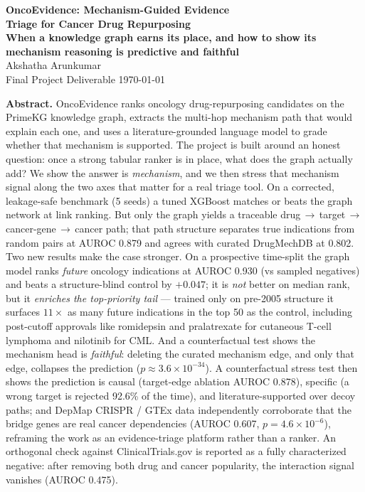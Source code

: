 \documentclass[11pt]{article}
\begin{document}
\begin{center}
  {\LARGE\bfseries\color{sriblue} OncoEvidence: Mechanism-Guided Evidence\\ Triage for Cancer Drug Repurposing}\\[4pt]
  {\large\bfseries\color{sriblue!80!black} When a knowledge graph earns its place, and how to show its\\ mechanism reasoning is predictive and faithful}\\[10pt]
  {\large Akshatha Arunkumar}\\[2pt]
  {\small Final Project Deliverable \quad\textbar\quad \today}
\end{center}

\vspace{2pt}
\begin{problembox}
\textbf{Abstract.} OncoEvidence ranks oncology drug-repurposing candidates on the
PrimeKG knowledge graph, extracts the multi-hop mechanism path that would explain each
one, and uses a literature-grounded language model to grade whether that mechanism is
supported. The project is built around an honest question: once a strong tabular ranker
is in place, what does the graph actually add? We show the answer is \emph{mechanism},
and we then stress that mechanism signal along the two axes that matter for a real
triage tool. On a corrected, leakage-safe benchmark (5 seeds) a tuned XGBoost matches or
beats the graph network at link ranking. But only the graph yields a traceable
drug\,$\to$\,target\,$\to$\,cancer-gene\,$\to$\,cancer path; that path structure
separates true indications from random pairs at AUROC 0.879 and agrees with curated
DrugMechDB at 0.802. Two new results make the case stronger. On a prospective time-split
the graph model ranks \emph{future} oncology indications at AUROC 0.930 (vs sampled
negatives) and beats a structure-blind control by $+0.047$; it is \emph{not} better on
median rank, but it \emph{enriches the top-priority tail} --- trained only on pre-2005
structure it surfaces $11\times$ as many future indications in the top 50 as the control,
including post-cutoff approvals like romidepsin and pralatrexate for cutaneous T-cell
lymphoma and nilotinib for CML. And a counterfactual test shows the mechanism head is \emph{faithful}:
deleting the curated mechanism edge, and only that edge, collapses the prediction
($p\approx3.6\times10^{-34}$). A counterfactual stress test then shows the prediction is
causal (target-edge ablation AUROC 0.878), specific (a wrong target is rejected 92.6\% of
the time), and literature-supported over decoy paths; and DepMap CRISPR / GTEx data
independently corroborate that the bridge genes are real cancer dependencies (AUROC 0.607,
$p=4.6\times10^{-6}$), reframing the work as an evidence-triage platform rather than a
ranker. An orthogonal check against ClinicalTrials.gov is reported as
a fully characterized negative: after removing both drug and cancer popularity, the
interaction signal vanishes (AUROC 0.475).
\end{problembox}
\end{document}
